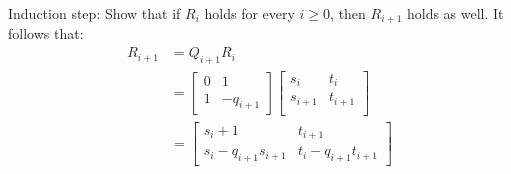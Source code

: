 \documentclass[11pt,a4paper]{article}
\begin{document}
\begin{enumerate}
\begin{enumerate}
		            Induction step: Show that if $R_i$ holds for every $i \geq 0$, then $R_{i + 1}$ holds as well. It follows that:
		            \begin{align*}
			            R_{i + 1} & = Q_{i + 1}R_i                                       \\
			                      & = \begin{bmatrix}
				                          0 & 1          \\
				                          1 & -q_{i + 1}
			                          \end{bmatrix} \begin{bmatrix}
				                                        s_i       & t_i       \\
				                                        s_{i + 1} & t_{i + 1} \\
			                                        \end{bmatrix}                \\
			                      & = \begin{bmatrix}
				                          s_i + 1                  & t_{i + 1}               \\
				                          s_i - q_{i + 1}s_{i + 1} & t_i -q_{i + 1}t_{i + 1}
			                          \end{bmatrix}
		            \end{align*}

	      \end{enumerate}
	      \newpage
\end{enumerate}
\end{document}
